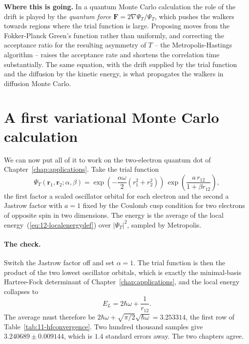 \begin{notebox}
\textbf{Where this is going.} In a quantum Monte Carlo calculation the role of
the drift is played by the \emph{quantum force}
$\bm{F}=2\nabla\Psi_T/\Psi_T$, which pushes the walkers towards regions where
the trial function is large.  Proposing moves from the Fokker-Planck Green's
function rather than uniformly, and correcting the acceptance ratio for the
resulting asymmetry of $T$ -- the Metropolis-Hastings algorithm -- raises the
acceptance rate and shortens the correlation time substantially.  The same
equation, with the drift supplied by the trial function and the diffusion by
the kinetic energy, is what propagates the walkers in diffusion Monte Carlo.
\end{notebox}

\section{A first variational Monte Carlo calculation}
\label{sec:firstvmc}

We can now put all of it to work on the two-electron quantum dot of
Chapter~\ref{chap:applications}.  Take the trial function
\begin{equation}
  \Psi_T(\bm{r}_1,\bm{r}_2;\alpha,\beta)
   = \exp\left(-\frac{\alpha\omega}{2}
       \left(r_1^2+r_2^2\right)\right)\,
     \exp\left(\frac{a\,r_{12}}{1+\beta r_{12}}\right),
  \label{eq:12-trialfunction}
\end{equation}
the first factor a scaled oscillator orbital for each electron and the second
a Jastrow factor with $a=1$ fixed by the Coulomb cusp condition for two
electrons of opposite spin in two dimensions.  The energy is the average of
the local energy~(\ref{eq:12-localenergydef}) over $|\Psi_T|^2$, sampled by
Metropolis.

\paragraph{The check.}
Switch the Jastrow factor off and set $\alpha=1$.  The trial function is then
the product of the two lowest oscillator orbitals, which is exactly the
minimal-basis Hartree-Fock determinant of Chapter~\ref{chap:applications}, and
the local energy collapses to
\begin{equation}
  E_L = 2\hbar\omega + \frac{1}{r_{12}} .
  \label{eq:12-localenergyalphaone}
\end{equation}
The average must therefore be
$2\hbar\omega+\sqrt{\pi/2}\sqrt{\hbar\omega}=3.253314$, the first row of
Table~\ref{tab:11-hfconvergence}.  Two hundred thousand samples give
$3.240689\pm0.009144$, which is $1.4$ standard errors away.  The two chapters
agree.


